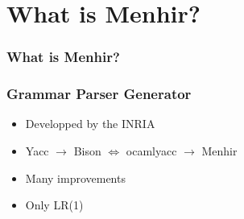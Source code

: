 \section{What is Menhir?}
\setcounter{subsection}{1}

\begin{frame}
\frametitle{What is Menhir?}
\end{frame}


\begin{frame}
  \frametitle{Grammar Parser Generator}
  \begin{itemize}
    \item Developped by the INRIA
    \item Yacc $\rightarrow$ Bison $\Leftrightarrow$ ocamlyacc $\rightarrow$ Menhir
    \item Many improvements
    \item Only LR(1)
  \end{itemize}
\end{frame}

